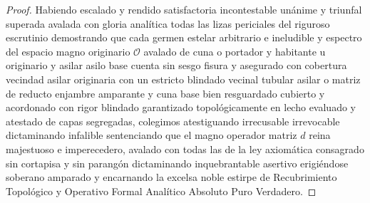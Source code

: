 \documentclass[11pt,a4paper]{article}
\theoremstyle{definition}
\theoremstyle{remark}
\numberwithin{equation}{section}
\begin{document}
\begin{proof}
Habiendo escalado y rendido satisfactoria incontestable unánime y triunfal superada avalada con gloria analítica todas las lizas periciales del riguroso escrutinio demostrando que cada germen estelar arbitrario e ineludible y espectro del espacio magno originario $\mathcal{O}$ avalado de cuna o portador y habitante u originario y asilar asilo base cuenta sin sesgo fisura y asegurado con cobertura vecindad asilar originaria con un estricto blindado vecinal tubular asilar o matriz de reducto enjambre amparante y cuna base bien resguardado cubierto y acordonado con rigor blindado garantizado topológicamente en lecho evaluado y atestado de capas segregadas, colegimos atestiguando irrecusable irrevocable dictaminando infalible sentenciando que el magno operador matriz $d$ reina majestuoso e imperecedero, avalado con todas las de la ley axiomática consagrado sin cortapisa y sin parangón dictaminando inquebrantable asertivo erigiéndose soberano amparado y encarnando la excelsa noble estirpe de Recubrimiento Topológico y Operativo Formal Analítico Absoluto Puro Verdadero.
\end{proof}
\end{document}
